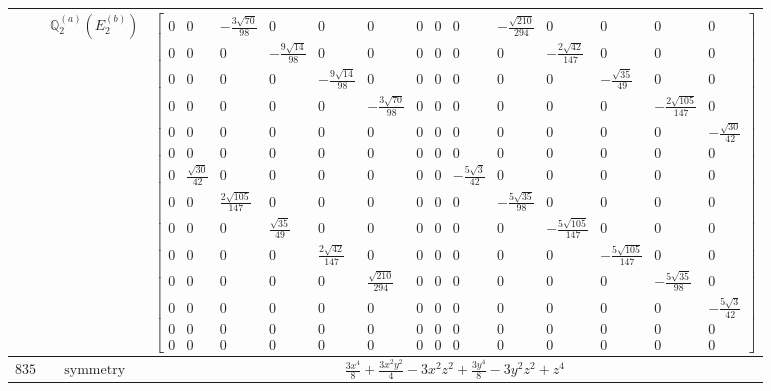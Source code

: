 \documentclass[fleqn,8pt,landscape]{jsarticle}
\begin{document}
\begin{longtable}{ccc}
$  $ & $ \mathbb{Q}_{2}^{(a)}(E_{2}^{(b)}) $ & $ \begin{bmatrix} 0 & 0 & - \frac{3 \sqrt{70}}{98} & 0 & 0 & 0 & 0 & 0 & 0 & - \frac{\sqrt{210}}{294} & 0 & 0 & 0 & 0 \\ 0 & 0 & 0 & - \frac{9 \sqrt{14}}{98} & 0 & 0 & 0 & 0 & 0 & 0 & - \frac{2 \sqrt{42}}{147} & 0 & 0 & 0 \\ 0 & 0 & 0 & 0 & - \frac{9 \sqrt{14}}{98} & 0 & 0 & 0 & 0 & 0 & 0 & - \frac{\sqrt{35}}{49} & 0 & 0 \\ 0 & 0 & 0 & 0 & 0 & - \frac{3 \sqrt{70}}{98} & 0 & 0 & 0 & 0 & 0 & 0 & - \frac{2 \sqrt{105}}{147} & 0 \\ 0 & 0 & 0 & 0 & 0 & 0 & 0 & 0 & 0 & 0 & 0 & 0 & 0 & - \frac{\sqrt{30}}{42} \\ 0 & 0 & 0 & 0 & 0 & 0 & 0 & 0 & 0 & 0 & 0 & 0 & 0 & 0 \\ 0 & \frac{\sqrt{30}}{42} & 0 & 0 & 0 & 0 & 0 & 0 & - \frac{5 \sqrt{3}}{42} & 0 & 0 & 0 & 0 & 0 \\ 0 & 0 & \frac{2 \sqrt{105}}{147} & 0 & 0 & 0 & 0 & 0 & 0 & - \frac{5 \sqrt{35}}{98} & 0 & 0 & 0 & 0 \\ 0 & 0 & 0 & \frac{\sqrt{35}}{49} & 0 & 0 & 0 & 0 & 0 & 0 & - \frac{5 \sqrt{105}}{147} & 0 & 0 & 0 \\ 0 & 0 & 0 & 0 & \frac{2 \sqrt{42}}{147} & 0 & 0 & 0 & 0 & 0 & 0 & - \frac{5 \sqrt{105}}{147} & 0 & 0 \\ 0 & 0 & 0 & 0 & 0 & \frac{\sqrt{210}}{294} & 0 & 0 & 0 & 0 & 0 & 0 & - \frac{5 \sqrt{35}}{98} & 0 \\ 0 & 0 & 0 & 0 & 0 & 0 & 0 & 0 & 0 & 0 & 0 & 0 & 0 & - \frac{5 \sqrt{3}}{42} \\ 0 & 0 & 0 & 0 & 0 & 0 & 0 & 0 & 0 & 0 & 0 & 0 & 0 & 0 \\ 0 & 0 & 0 & 0 & 0 & 0 & 0 & 0 & 0 & 0 & 0 & 0 & 0 & 0 \end{bmatrix} $ \\ \hline
$ 835 $ & $ \text{symmetry} $ & $ \frac{3 x^{4}}{8} + \frac{3 x^{2} y^{2}}{4} - 3 x^{2} z^{2} + \frac{3 y^{4}}{8} - 3 y^{2} z^{2} + z^{4} $ \\

\end{longtable}
\end{document}
